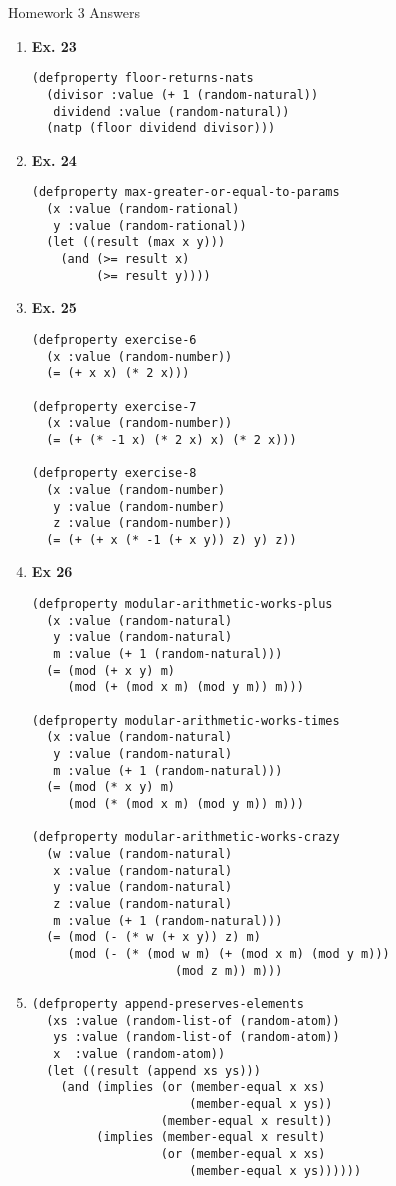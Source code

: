 \documentclass{article}
\begin{document}
  \begin{center}
    {\Large Homework 3 Answers}
  \end{center}
  \begin{enumerate}
    \item {\bf Ex. 23}
\begin{verbatim}
(defproperty floor-returns-nats
  (divisor :value (+ 1 (random-natural))
   dividend :value (random-natural))
  (natp (floor dividend divisor)))
\end{verbatim}
    \item {\bf Ex. 24}
\begin{verbatim}
(defproperty max-greater-or-equal-to-params
  (x :value (random-rational)
   y :value (random-rational))
  (let ((result (max x y)))
    (and (>= result x)
         (>= result y))))
\end{verbatim}
\item {\bf Ex. 25}
\begin{verbatim}
(defproperty exercise-6
  (x :value (random-number))
  (= (+ x x) (* 2 x)))

(defproperty exercise-7
  (x :value (random-number))
  (= (+ (* -1 x) (* 2 x) x) (* 2 x)))

(defproperty exercise-8
  (x :value (random-number)
   y :value (random-number)
   z :value (random-number))
  (= (+ (+ x (* -1 (+ x y)) z) y) z))
\end{verbatim}
\item {\bf Ex 26}
\begin{verbatim}
(defproperty modular-arithmetic-works-plus
  (x :value (random-natural)
   y :value (random-natural)
   m :value (+ 1 (random-natural)))
  (= (mod (+ x y) m)
     (mod (+ (mod x m) (mod y m)) m)))

(defproperty modular-arithmetic-works-times
  (x :value (random-natural)
   y :value (random-natural)
   m :value (+ 1 (random-natural)))
  (= (mod (* x y) m)
     (mod (* (mod x m) (mod y m)) m)))

(defproperty modular-arithmetic-works-crazy
  (w :value (random-natural)
   x :value (random-natural)
   y :value (random-natural)
   z :value (random-natural)
   m :value (+ 1 (random-natural)))
  (= (mod (- (* w (+ x y)) z) m)
     (mod (- (* (mod w m) (+ (mod x m) (mod y m)))
                    (mod z m)) m)))
\end{verbatim}
\item
\begin{verbatim}
(defproperty append-preserves-elements
  (xs :value (random-list-of (random-atom))
   ys :value (random-list-of (random-atom))
   x  :value (random-atom))
  (let ((result (append xs ys)))
    (and (implies (or (member-equal x xs)
                      (member-equal x ys))
                  (member-equal x result))
         (implies (member-equal x result)
                  (or (member-equal x xs)
                      (member-equal x ys))))))
\end{verbatim}
\end{enumerate}
\end{document}
